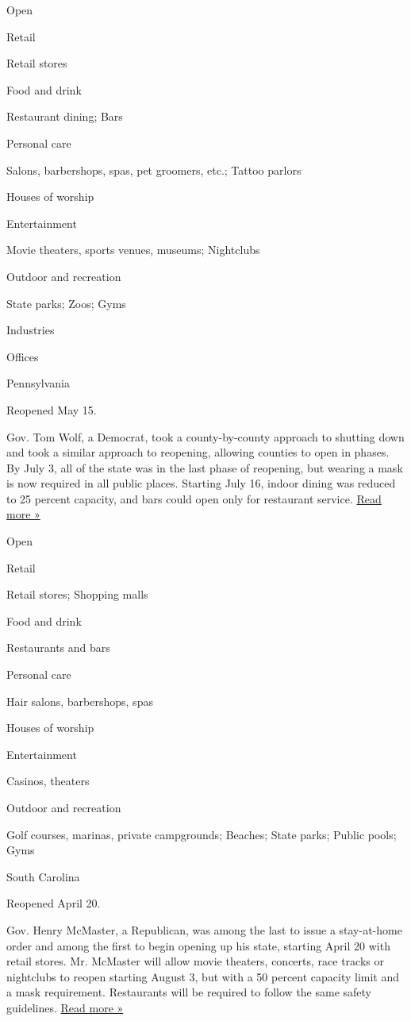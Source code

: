 Open

Retail

Retail stores

Food and drink

Restaurant dining; Bars

Personal care

Salons, barbershops, spas, pet groomers, etc.; Tattoo parlors

Houses of worship

Entertainment

Movie theaters, sports venues, museums; Nightclubs

Outdoor and recreation

State parks; Zoos; Gyms

Industries

Offices

Pennsylvania

Reopened May 15.

Gov. Tom Wolf, a Democrat, took a county-by-county approach to shutting
down and took a similar approach to reopening, allowing counties to open
in phases. By July 3, all of the state was in the last phase of
reopening, but wearing a mask is now required in all public places.
Starting July 16, indoor dining was reduced to 25 percent capacity, and
bars could open only for restaurant service.
\href{https://www.wgal.com/article/gov-tom-wolf-imposes-new-restrictions-on-pennsylvania-bars-restaurants-gatherings/33346910}{Read
more »}

Open

Retail

Retail stores; Shopping malls

Food and drink

Restaurants and bars

Personal care

Hair salons, barbershops, spas

Houses of worship

Entertainment

Casinos, theaters

Outdoor and recreation

Golf courses, marinas, private campgrounds; Beaches; State parks; Public
pools; Gyms

South Carolina

Reopened April 20.

Gov. Henry McMaster, a Republican, was among the last to issue a
stay-at-home order and among the first to begin opening up his state,
starting April 20 with retail stores. Mr. McMaster will allow movie
theaters, concerts, race tracks or nightclubs to reopen starting August
3, but with a 50 percent capacity limit and a mask requirement.
Restaurants will be required to follow the same safety guidelines.
\href{https://www.wbtv.com/2020/07/29/sc-governor-announces-targeted-mask-requirements-reopens-more-businesses/}{Read
more »}

